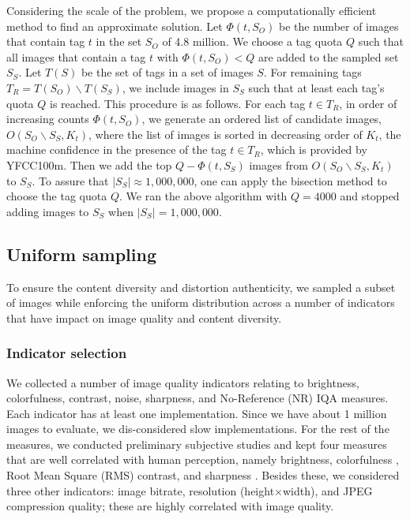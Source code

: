 \documentclass{article}
\begin{document}
Considering the scale of the problem, we propose a computationally efficient method to find an approximate solution. Let $\Phi(t, S_O)$ be the number of images that contain tag $t$ in the set $S_O$ of 4.8 million. We choose a tag quota $Q$ such that all images that contain a tag $t$ with $\Phi(t, S_O) < Q$ are added to the sampled set $S_S$. Let $T(S)$ be the set of tags in a set of images $S$.  For remaining tags $T_R = T(S_O) \backslash T(S_S)$, we include images in $S_S$ such that at least each tag's quota $Q$ is reached. This procedure is as follows. For each tag $t \in T_R$, in  order of increasing counts $\Phi(t, S_O)$, 
we generate an ordered list of candidate images, $O(S_O \backslash S_S, K_t)$, where the list of images is sorted in decreasing order of  $K_t$, the machine confidence in the presence of the tag $t \in T_R$, which is provided by YFCC100m. Then we add the top $Q - \Phi(t, S_S)$ images from $O(S_O \backslash S_S, K_t)$ to $S_S$. To assure that $|S_S| \approx 1,000,000$, one can apply the bisection method to choose the tag quota $Q$. We ran the above algorithm with $Q = 4000$ and stopped adding images to $S_S$ when $|S_S| = 1,000,000 $.



\subsection{Uniform sampling}



To ensure the content diversity and distortion authenticity, we sampled a subset of images while enforcing the uniform distribution across a number of indicators that have impact on image quality and content diversity.


\subsubsection{Indicator selection}
We collected a number of image quality indicators relating to brightness, colorfulness, contrast, noise, sharpness, and No-Reference (NR) IQA measures. Each indicator has at least one implementation. Since we have about 1 million images to evaluate, we dis-considered slow implementations. For the rest of the measures, we conducted preliminary subjective studies and kept four measures that are well correlated with human perception, namely brightness, colorfulness \cite{Hasler:2003}, Root Mean Square (RMS) contrast, and sharpness \cite{Vu:2012}. Besides these, we considered three other indicators: image  bitrate, resolution (height$\times$width), and JPEG compression quality; these are highly correlated with image quality.  
\end{document}
